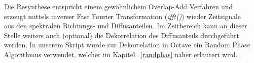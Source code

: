 Die Resynthese entspricht einem gewöhnlichem Overlap-Add Verfahren und erzeugt mittels inverser Fast Fourier Transformation (\textit{ifft()}) wieder Zeitsignale aus den spektralen Richtungs- und Diffusanteilen. Im Zeitbereich kann an dieser Stelle weiters auch (optional) die Dekorrelation des Diffusanteils durchgeführt werden. In unserem Skript wurde zur Dekorrelation in Octave ein Random Phase Algorithmus verwendet, welcher im Kapitel ~\ref{randphas} näher erläutert wird.

